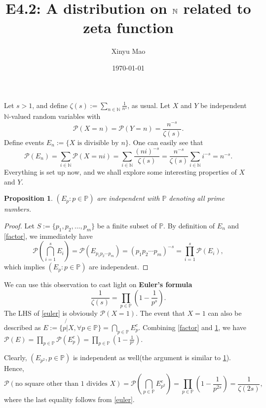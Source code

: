 \documentclass[12pt]{article}
\title{E4.2: A distribution on $\N$ related to zeta function}
\author{Xinyu Mao}
\date{\today}
\newtheorem{proposition}[theorem]{Proposition}
\newcommand\N{\mathbb{N}}
\newcommand\pp{\mathcal{P}}
\newcommand\PP{\mathbb{P}}
\newcommand\pr[1]{\mathcal{P} \left( #1\right)}
\begin{document}
\maketitle

Let $s > 1$, and define $\zeta(s) := \sum_{n \in \N} \frac{1}{n^s}$, as usual. 
Let $X$ and $Y$ be independent $\N$-valued random variables with
$$
    \pp(X = n) = \pp(Y = n) = \frac{n^{-s}}{\zeta(s)}.
$$
Define events $E_n := \{ \text{$X$ is divisible by $n$}\}$.
One can easily see that 
\begin{equation} \label{factor}
    \pp(E_n) = \sum_{i \in \N} \pp(X = ni) 
    = \sum_{i \in \N} \frac{(ni)^{-s}}{\zeta(s)}
    = \frac{n^{-s}}{\zeta(s)} \sum_{i \in \N} i^{-s}= n^{-s}.
\end{equation}
Everything is set up now, and we shall explore some interesting properties of 
$X$ and $Y$.

\begin{proposition} \label{ind}
    $(E_p : p \in \PP)$ are independent with $\PP$ denoting all prime numbers.
\end{proposition}
\begin{proof}
    Let $S := \{p_1,p_2,\dots,p_m\}$ be a finite subset of $\PP$.
    By definition of $E_n$ and \cref{factor}, we immediately have 
    $$
        \pr{\bigcap_{i = 1}^s E_i} = \pr{E_{p_1p_2\cdots p_m}}
        = (p_1p_2\cdots p_m)^{-s} = \prod_{i = 1}^s\pp(E_i),
    $$
    which implies  $(E_p : p \in \PP)$ are independent.
\end{proof}

We can use this observation to cast light on \textbf{Euler's formula}
\begin{equation} \label{euler}
    \frac{1}{\zeta(s)} = \prod_{p \in \PP} (1 - \frac{1}{p^s}).
\end{equation}
The LHS of \cref{euler} is obviously $\pp(X = 1)$. 
The event that $X = 1$ can also be described as 
$E := \{p \not{|} X, \forall p \in \PP\} = \bigcap_{p \in \PP}E_p^c$.
Combining \cref{factor} and \cref{ind}, 
we have $\pp(E) = \prod_{p\in \PP} \pp(E_p^c) = 
\prod_{p \in \PP} (1 - \frac{1}{p^s})$.

Clearly, $(E_{p^2},p \in \PP)$ is independent as well(the argument is similar to \cref{ind}).
Hence,
$$
    \pp(\text{no square other than 1 divides $X$}) 
    = \pr{\bigcap_{p \in \PP} E_{p^2}^c} 
    = \prod_{p \in \PP} (1 - \frac{1}{p^{2s}}) = \frac{1}{\zeta(2s)},
$$ 
where the last equality follows from \cref{euler}.
\end{document}
